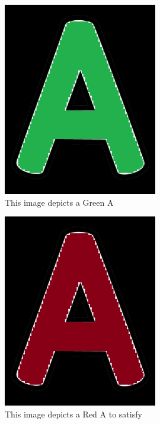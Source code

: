 \documentclass[12pt, titlepage]{article}
\begin{document}
\begin{figure}[h!]
  \begin{center}
    \includegraphics[width=0.6\textwidth]{GreenA}
  \caption{This image depicts a Green A}
  \label{Fig_greenA} 
  \end{center}
  \end{figure}

\begin{figure}[h!]
  \begin{center}
    \includegraphics[width=0.6\textwidth]{RedA}
  \caption{This image depicts a Red A to satisfy}
  \label{Fig_redA} 
  \end{center}
  \end{figure}
\end{document}
